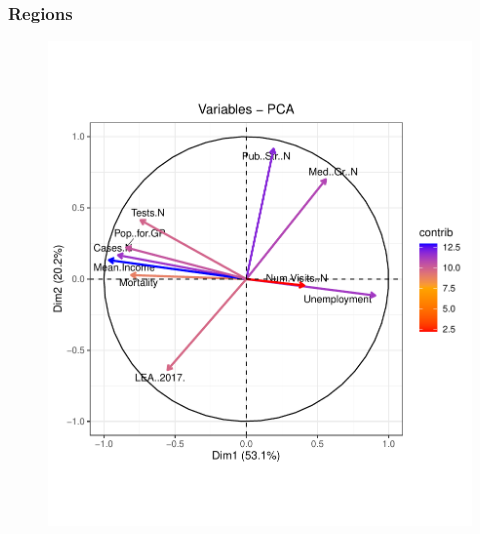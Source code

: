 \documentclass[compress]{beamer}
\begin{document}
\begin{frame}
\begin{figure}[H]
\begin{minipage}{.3\textwidth}
\end{minipage}
\end{figure}
\end{frame}

\begin{frame}
\frametitle{Regions}

\begin{figure}[H]
\centering
\begin{minipage}{.5\textwidth}
  \centering
  \includegraphics[width=\linewidth, ]{Pic/Regioni_PCA_loadings.pdf}
\end{minipage}%
\begin{minipage}{.5\textwidth}
  \centering

\end{minipage}
\end{figure}
\end{frame}
\end{document}
